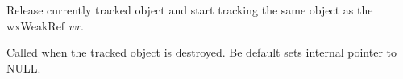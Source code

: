 \label{wxweakrefoperatorassign2}


Release currently tracked object and start tracking the same object as
the wxWeakRef {\it wr}.


\label{wxweakrefonobjectdestroy}


Called when the tracked object is destroyed. Be default sets
internal pointer to NULL.

